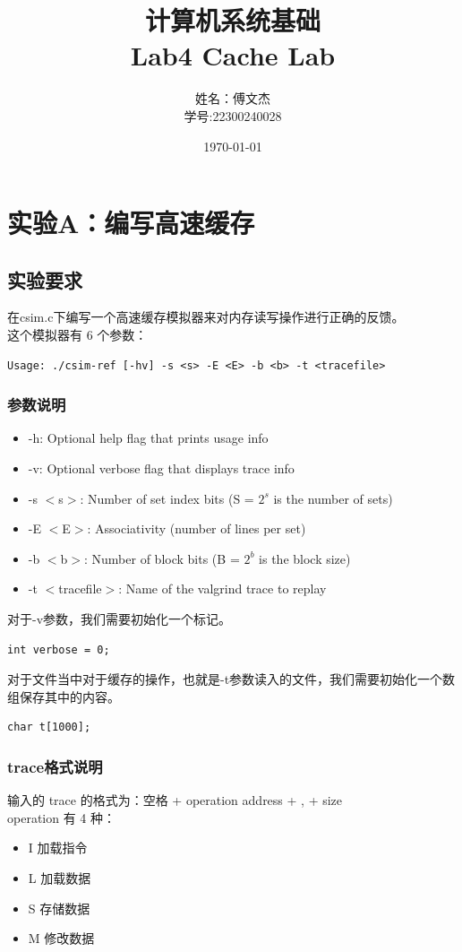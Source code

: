 \documentclass[12pt, a4paper, oneside]{ctexart}
\title{计算机系统基础 \\ Lab4 Cache Lab} %
\author{姓名：傅文杰\\学号:22300240028} %
\date{\today} %
\begin{document}
\maketitle %

\tableofcontents %

\section{实验A：编写高速缓存} %

\subsection{实验要求}
\noindent
在csim.c下编写一个高速缓存模拟器来对内存读写操作进行正确的反馈。\\这个模拟器有 6 个参数：
\begin{lstlisting}
Usage: ./csim-ref [-hv] -s <s> -E <E> -b <b> -t <tracefile>
\end{lstlisting}
\subsubsection{参数说明}
\begin{itemize}
    \item -h: Optional help flag that prints usage info
    \item -v: Optional verbose flag that displays trace info
    \item -s $<$s$>$: Number of set index bits (S = $2^s$ is the number of sets)
    \item -E $<$E$>$: Associativity (number of lines per set)
    \item -b $<$b$>$: Number of block bits (B = $2^b$ is the block size)
    \item -t $<$tracefile$>$: Name of the valgrind trace to replay    
\end{itemize}
对于-v参数，我们需要初始化一个标记。
\begin{lstlisting}
int verbose = 0; 
\end{lstlisting}
对于文件当中对于缓存的操作，也就是-t参数读入的文件，我们需要初始化一个数组保存其中的内容。
\begin{lstlisting}
char t[1000];
\end{lstlisting}
\subsubsection{trace格式说明}
\noindent
输入的 trace 的格式为：空格 + operation address + , + size\\
operation 有 4 种：
\begin{itemize}
    \item I 加载指令
    \item L 加载数据
    \item S 存储数据 
    \item M 修改数据
\end{itemize}
\end{document}
